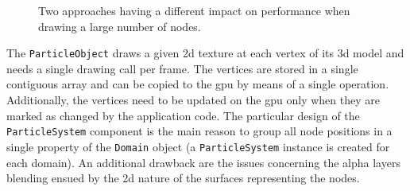 \begin{figure}
  \begin{adjustwidth}{-1.4mm}{-2.2mm}
    \hfill
  \end{adjustwidth}
  \caption[Two different approaches to render a large number of nodes.]{Two approaches having a different impact on performance when drawing a large number of nodes.}%
  \label{fig:node-draw}
\end{figure}

The \texttt{ParticleObject} draws a given \gls{2d} texture at each vertex of its \gls{3d} model and needs a single drawing call per frame. The vertices are stored in a single contiguous array and can be copied to the \gls{gpu} by means of a single operation. Additionally, the vertices need to be updated on the \gls{gpu} only when they are marked as changed by the application code. The particular design of the \texttt{ParticleSystem} component is the main reason to group all node positions in a single property of the \texttt{Domain} object (a \texttt{ParticleSystem} instance is created for each domain). An additional drawback are the issues concerning the alpha layers blending ensued by the \gls{2d} nature of the surfaces representing the nodes.

